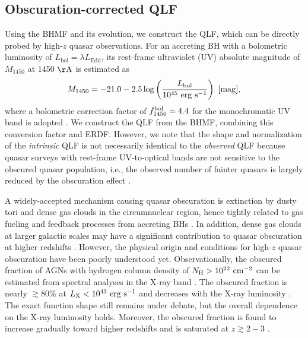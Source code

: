\documentclass[twocolumn, twocolappendix]{aastex63}
\newcommand{\Muv}{M_{1450}}
\newcommand{\Lbol}{L_\mathrm{bol}}
\begin{document}
\begin{CJK*}{UTF8}{gbsn}
\vspace{2mm}
\subsection{Obscuration-corrected QLF}\label{sec:LF}

Using the BHMF and its evolution, we construct the QLF, which can be directly probed by high-$z$ quasar observations.
For an accreting BH with a bolometric luminosity of $\Lbol=\lambda L_\mathrm{Edd}$, 
its rest-frame ultraviolet (UV) absolute magnitude of $\Muv$ at 1450 $\mathrm{\AA}$ is estimated as
%
\begin{equation}
  \label{eq:M1450}
  \Muv= -21.0-2.5 \log  \left(\frac{\Lbol}{10^{45}~\mathrm{erg~s}^{-1}} \right) ~[\rm{mag}],
\end{equation}
%
where a bolometric correction factor of $f^{\rm bol}_{1450}=4.4$ for the monochromatic UV band is adopted
\citep{2006ApJS..166..470R}.
We construct the QLF from the BHMF, combining this conversion factor and ERDF.
However, we note that the shape and normalization of the {\it intrinsic} QLF is not necessarily identical to the {\it observed} QLF
because quasar surveys with rest-frame UV-to-optical bands are not sensitive to the obscured quasar population,
i.e., the observed number of fainter quasars is largely reduced by the obscuration effect
\citep{2003ApJ...598..886U,2007A&A...463...79G,2008A&A...490..905H,2014ApJ...786..104U,2014MNRAS.437.3550M}. 


A widely-accepted mechanism causing quasar obscuration is extinction by dusty tori and dense gas clouds 
in the circumnuclear region, hence tightly related to gas fueling and feedback processes from accreting BHs 
\citep[see][for a review]{2018ARA&A..56..625H}.
In addition, dense gas clouds at larger galactic scales may have a significant contribution to quasar obscuration at 
higher redshifts \citep{2020MNRAS.495.2135N}.
However, the physical origin and conditions for high-$z$ quasar obscuration have been poorly understood yet.
Observationally, the obscured fraction of AGNs with hydrogen column density of $N_{\rm H}>10^{22}~{\rm cm}^{-2}$
can be estimated from spectral analyses in the X-ray band
\citep[e.g.,][]{2003ApJ...598..886U,2007A&A...463...79G,2008A&A...490..905H}. 
The obscured fraction is nearly $\gtrsim 80\%$ at $L_{\rm X}<10^{43}~{\rm erg~s}^{-1}$ and 
decreases with the X-ray luminosity \citep{2014ApJ...786..104U,2014MNRAS.437.3550M}.
The exact function shape still remains under debate, but the overall dependence on the X-ray luminosity holds.
Moreover, the obscured fraction is found to increase gradually toward higher redshifts and is saturated at $z\gtrsim 2-3$
\citep{2008A&A...490..905H,2014ApJ...786..104U,2014MNRAS.437.3550M,2018MNRAS.473.2378V,2022A&A...666A..17G}.



\end{CJK*}
\end{document}
